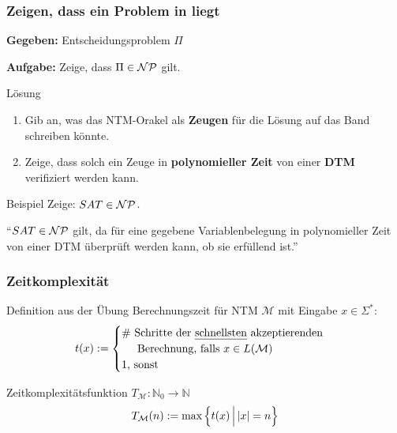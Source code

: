 \begin{frame}
	\frametitle{\recipe Zeigen, dass ein Problem in \classNP{} liegt}
	
	\textbf{Gegeben:} Entscheidungsproblem $\Pi$
	
	\textbf{Aufgabe:} Zeige, dass $\Pi \in \mathcal{NP}$ gilt.
	
	\ducttape{.5cm}

	\begin{block}{Lösung}	
	\begin{enumerate}
		\item Gib an, was das NTM-Orakel als \textbf{Zeugen} für die Lösung auf das Band schreiben könnte.
		\item Zeige, dass solch ein Zeuge in \textbf{polynomieller Zeit} von einer \textbf{DTM} verifiziert werden kann.
	\end{enumerate}
		
	\end{block}
	
	\begin{block}{Beispiel}
	Zeige: $SAT \in \mathcal{NP}$.
	
	"`$SAT \in \mathcal{NP}$ gilt, da für eine gegebene Variablenbelegung in polynomieller Zeit von einer DTM überprüft werden kann, ob sie erfüllend ist."'
	\end{block}
		
\end{frame}

\begin{frame}

\frametitle{Zeitkomplexität}
\begin{block}{Definition aus der Übung}
    Berechnungszeit für NTM $\mathcal{M}$ mit Eingabe $x \in \Sigma^*$: \\
    $$t(x) := \begin{cases}
                \text{\# Schritte der \emph{schnellsten} akzeptierenden} \\ \hspace{0.5cm}\text{Berechnung, falls  } x \in L(\mathcal{M})\\ 
                1 \text{, sonst}
             \end{cases} $$
 
    Zeitkomplexitätsfunktion $T_\mathcal{M} : \mathbb{N}_0 \rightarrow \mathbb{N}$ \\
    $$T_\mathcal{M}(n) := \text{max}\left\lbrace \vphantom{x^j_j} t(x) \,\middle\vert\, \left\vert x \right\vert = n  \right\rbrace$$

\end{block}

\end{frame}

